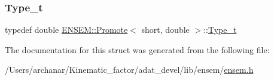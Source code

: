 \subsubsection{\texorpdfstring{Type\_t}{Type\_t}\hspace{0.1cm}{\footnotesize\ttfamily [2/2]}}
{\footnotesize\ttfamily typedef double \mbox{\hyperlink{structENSEM_1_1Promote}{E\+N\+S\+E\+M\+::\+Promote}}$<$ short, double $>$\+::\mbox{\hyperlink{structENSEM_1_1Promote_3_01short_00_01double_01_4_acad0693c601980c2646626dac6d30140}{Type\+\_\+t}}}



The documentation for this struct was generated from the following file\+:\begin{DoxyCompactItemize}
\item 
/\+Users/archanar/\+Kinematic\+\_\+factor/adat\+\_\+devel/lib/ensem/\mbox{\hyperlink{lib_2ensem_2ensem_8h}{ensem.\+h}}\end{DoxyCompactItemize}
